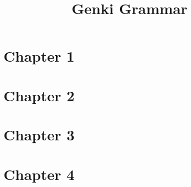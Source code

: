 \documentclass{article}
\title{Genki Grammar}
\newcommand{\inputchapter}[2]{\section{Chapter #1}}
\begin{document}
\tableofcontents

\inputchapter{1}{01.tex}
\inputchapter{2}{02.tex}
\inputchapter{3}{03.tex}
\inputchapter{4}{04.tex}
\end{document}
